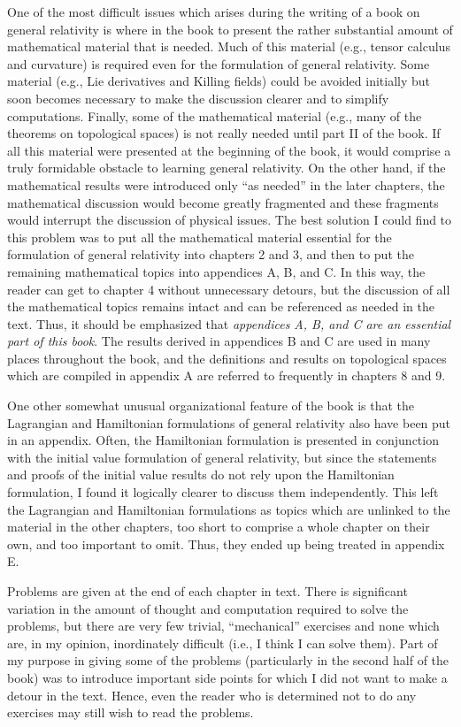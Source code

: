 One of the most difficult issues which arises during the writing of a book on
general relativity is where in the book to present the rather substantial amount of
mathematical material that is needed. Much of this material (e.g., tensor calculus
and curvature) is required even for the formulation of general relativity. Some
material (e.g., Lie derivatives and Killing fields) could be avoided initially but
soon becomes necessary to make the discussion clearer and to simplify
computations. Finally, some of the mathematical material (e.g., many of the
theorems on topological spaces) is not really needed until part II of the book. If
all this material were presented at the beginning of the book, it would comprise a
truly formidable obstacle to learning general relativity. On the other hand, if the
mathematical results were introduced only \textquotedblleft as needed\textquotedblright{}
in the later chapters, the mathematical discussion would become greatly fragmented
and these fragments would interrupt the discussion of physical issues. The best
solution I could find to this problem was to put all the mathematical material
essential for the formulation of general relativity into chapters 2 and 3, and then
to put the remaining mathematical topics into appendices A, B, and C. In this way,
the reader can get to chapter 4 without unnecessary detours, but the discussion of
all the mathematical topics remains intact and can be referenced as needed in the
text. Thus, it should be emphasized that
\emph{appendices A, B, and C are an essential part of this book}. The results
derived in appendices B and C are used in many places throughout the book, and
the definitions and results on topological spaces which are compiled in appendix A
are referred to frequently in chapters 8 and 9.

One other somewhat unusual organizational feature of the book is that the
Lagrangian and Hamiltonian formulations of general relativity also have been put in
an appendix. Often, the Hamiltonian formulation is presented in conjunction with
the initial value formulation of general relativity, but since the statements and
proofs of the initial value results do not rely upon the Hamiltonian formulation, I
found it logically clearer to discuss them independently. This left the Lagrangian
and Hamiltonian formulations as topics which are unlinked to the material in the
other chapters, too short to comprise a whole chapter on their own, and too
important to omit. Thus, they ended up being treated in appendix E.

Problems are given at the end of each chapter in text. There is significant
variation in the amount of thought and computation required to solve the problems,
but there are very few trivial, \textquotedblleft mechanical\textquotedblright{}
exercises and none which are, in my opinion, inordinately difficult (i.e., I think I
can solve them). Part of my purpose in giving some of the problems (particularly in
the second half of the book) was to introduce important side points for which I did
not want to make a detour in the text. Hence, even the reader who is determined
not to do any exercises may still wish to read the problems.

